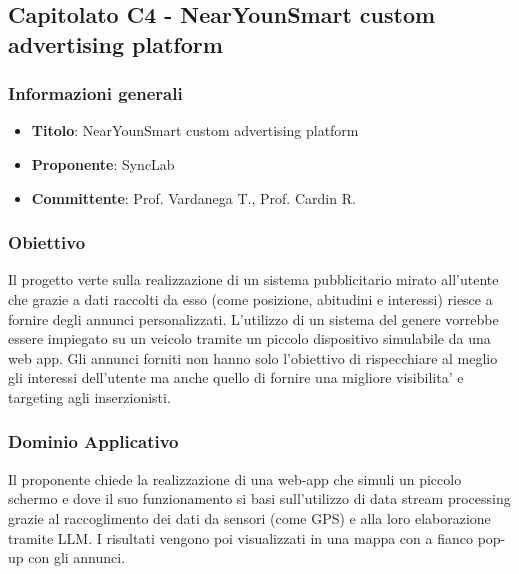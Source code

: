 \subsection{Capitolato C4 - NearYounSmart custom advertising platform}
     \subsubsection{Informazioni generali}
        \begin{itemize}
            \item \textbf{Titolo}: NearYounSmart custom advertising platform
            \item \textbf{Proponente}: SyncLab
            \item \textbf{Committente}: Prof. Vardanega T., Prof. Cardin R.
        \end{itemize}
     \subsubsection{Obiettivo}
    Il progetto verte sulla realizzazione di un sistema pubblicitario mirato all’utente che grazie a dati raccolti da esso (come posizione, abitudini e interessi) riesce a fornire degli annunci personalizzati. L’utilizzo di un sistema del genere vorrebbe essere impiegato su un veicolo tramite un piccolo dispositivo simulabile da una web app. Gli annunci forniti non hanno solo l'obiettivo di rispecchiare al meglio gli interessi dell’utente ma anche quello di fornire una migliore visibilita’ e targeting agli inserzionisti.
     \subsubsection{Dominio Applicativo}
    Il proponente chiede la realizzazione di una web-app che simuli un piccolo schermo e dove il suo funzionamento si basi sull’utilizzo di data stream processing grazie al raccoglimento dei dati da sensori (come GPS) e alla loro elaborazione tramite LLM. I risultati vengono poi visualizzati in una mappa con a fianco pop-up con gli annunci.
